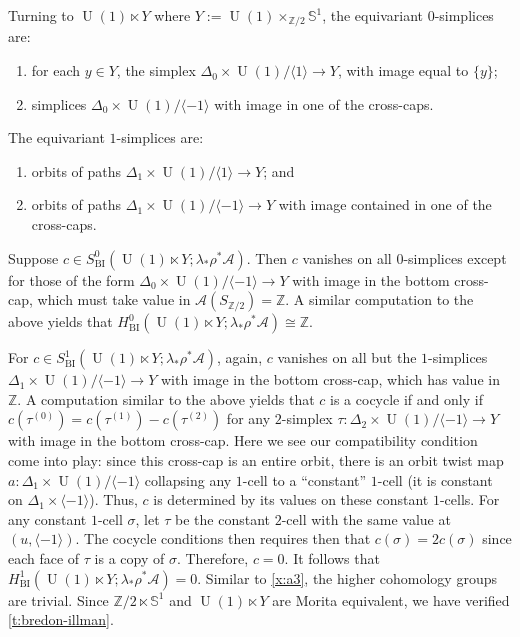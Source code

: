 \documentclass[12pt,reqno]{amsart}
\newcommand{\printname}[1]{}
\renewcommand{\printname}[1]
	{{\color{brown}{\makebox[0pt]{\hspace{-1in}\raisebox{8pt}{\tiny #1}}}}}
\newcommand{\labell}[1]{\label{#1} \printname{#1}}
\newcommand{\calA}{{\mathcal{A}}}
\renewcommand{\SS}{{\mathbb{S}}} %
\newcommand{\ZZ}{{\mathbb{Z}}}  %
\newcommand{\U}{{\operatorname{U}}}  %
\theoremstyle{plain}
\theoremstyle{definition}
\newenvironment{example}
		{\pushQED{\qed}\renewcommand{\qedsymbol}{$/\!\!/$}\examplex}
		{\popQED\endexamplex}
\newcommand{\BI}{{\operatorname{BI}}} %
\begin{document}
    \begin{example}[{\bf Groupoid B}] \labell{x:b3}
        Turning to $\U(1)\ltimes Y$ where $Y:=\U(1)\times_{\ZZ/2}\SS^1$, the equivariant $0$-simplices are:
        \begin{enumerate}
            \item for each $y\in Y$, the simplex $\Delta_0\times\U(1)/\langle1\rangle\to Y$, with image equal to $\{y\}$;
            \item simplices $\Delta_0\times\U(1)/\langle-1\rangle$ with image in one of the cross-caps.
        \end{enumerate}

        The equivariant $1$-simplices are:
        \begin{enumerate}
            \item orbits of paths $\Delta_1\times\U(1)/\langle1\rangle\to Y$; and
            \item orbits of paths $\Delta_1\times\U(1)/\langle-1\rangle\to Y$ with image contained in one of the cross-caps.
        \end{enumerate}

        Suppose $c\in S^0_\BI(\U(1)\ltimes Y;\lambda_*\rho^*\calA)$.  Then $c$ vanishes on all $0$-simplices except for those of the form $\Delta_0\times\U(1)/\langle-1\rangle\to Y$ with image in the bottom cross-cap, which must take value in $\calA(S_{\ZZ/2})=\ZZ$.  A similar computation to the above yields that $H^0_\BI(\U(1)\ltimes Y;\lambda_*\rho^*\calA)\cong\ZZ$.

        For $c\in S^1_\BI(\U(1)\ltimes Y;\lambda_*\rho^*\calA)$, again, $c$ vanishes on all but the $1$-simplices $\Delta_1\times\U(1)/\langle-1\rangle\to Y$ with image in the bottom cross-cap, which has value in $\ZZ$.  A computation similar to the above yields that $c$ is a cocycle if and only if $c(\tau^{(0)})=c(\tau^{(1)})-c(\tau^{(2)})$ for any $2$-simplex $\tau\colon\Delta_2\times\U(1)/\langle-1\rangle\to Y$ with image in the bottom cross-cap.  Here we see our compatibility condition come into play:  since this cross-cap is an entire orbit, there is an orbit twist map  $a\colon\Delta_1\times\U(1)/\langle-1\rangle$ collapsing any $1$-cell to a ``constant'' $1$-cell (it is constant on $\Delta_1\times\langle-1\rangle$).  Thus, $c$ is determined by its values on these constant $1$-cells.  For any constant $1$-cell $\sigma$, let $\tau$ be the constant $2$-cell with the same value at $(u,\langle-1\rangle)$.  The cocycle conditions then requires then that $c(\sigma)=2c(\sigma)$ since each face of $\tau$ is a copy of $\sigma$.  Therefore, $c=0$.  It follows that $H^1_\BI(\U(1)\ltimes Y;\lambda_*\rho^*\calA)=0$.  Similar to \cref{x:a3}, the higher cohomology groups are trivial.  Since $\ZZ/2\ltimes\SS^1$ and $\U(1)\ltimes Y$ are Morita equivalent, we have verified \cref{t:bredon-illman}.
    \end{example}    
\end{document}
